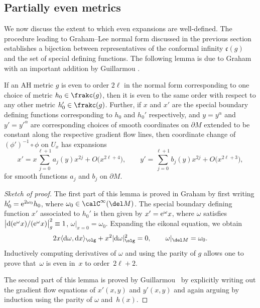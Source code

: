 \subsection{Partially even metrics}

We now discuss the extent to which even expansions are well-defined. The procedure leading to Graham--Lee normal form discussed in the previous section establishes a bijection between representatives of the conformal infinity $\mathfrak c(g)$ and the set of special defining functions. The following lemma is due to Graham \cite{Gr} with an important addition by Guillarmou \cite{Guillarmou}.

\begin{Proposition}\label{proposition1.5}
If an AH metric $g$ is even to order $2\ell$ in the normal form corresponding to one choice of metric $h_0 \in \frakc (g)$,
then it is even to the same order with respect to any other metric $h_0' \in \frakc(g)$. Further, if $x$ and $x'$ are the special boundary defining functions corresponding to $h_0$ and $h_0'$ respectively, and $y = y^{\alpha}$ and $y' = {y'}^{\alpha}$ are corresponding choices of smooth coordinates on $\partial M$ extended to be constant along the respective gradient flow lines, then coordinate change of $(\phi')^{-1}\circ \phi$ on $U_x$ has expansions
\[ x' = x \sum_{j=0}^{\ell+1} a_j(y) x^{2j} + O\big(x^{2\ell+4}\big), \qquad y' = \sum_{j=0}^{\ell+1} b_j(y) x^{2j} + O\big(x^{2\ell+3}\big), \]
for smooth functions $a_j$ and $b_j$ on $\partial M$.
\end{Proposition}
\begin{proof}[Sketch of proof] The first part of this lemma is proved in Graham \cite{Gr} by first writing $h_0' = {\rm e}^{2\omega_0} h_0$, where $\omega_0 \in \calC^\infty(\del M)$. The special boundary defining function $x'$ associated to $h_0'$ is then given by $x' = {\rm e}^{\omega} x$, where $\omega$ satisfies $\big| {\rm d}({\rm e}^\omega x)/ ({\rm e}^\omega x)\big|^2_g \equiv 1$, $\omega|_{x=0} = \omega_0$. Expanding the eikonal equation, we obtain
\begin{gather}\label{eq1.7}
2x \langle {\rm d}\omega, {\rm d}x \rangle_{\olg} + x^2 |{\rm d}\omega|^2_{\olg} = 0, \qquad \omega |_{\del M} = \omega_0.
\end{gather}
Inductively computing derivatives of $\omega$ and using the parity of $g$ allows one to prove that~$\omega$ is even in~$x$ to order~$2 \ell+2$.

The second part of this lemma is proved by Guillarmou~\cite{Guillarmou} by explicitly writing out the gradient flow equations of $x'(x,y)$ and $y'(x,y)$ and again arguing by induction using the parity of $\omega$ and~$h(x)$.
\end{proof}

